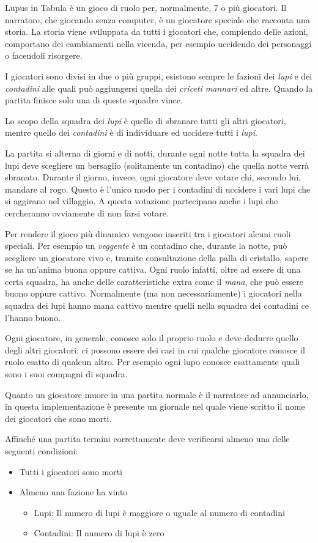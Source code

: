Lupus in Tabula è un gioco di ruolo per, normalmente, 7 o più giocatori. Il narratore, che giocando senza computer, è un giocatore speciale che racconta una storia. La storia viene sviluppata da tutti i giocatori che, compiendo delle azioni, comportano dei cambiamenti nella vicenda, per esempio uccidendo dei personaggi o facendoli risorgere.

I giocatori sono divisi in due o più gruppi, esistono sempre le fazioni dei \emph{lupi} e dei \emph{contadini} alle quali può aggiungersi quella dei \emph{criceti mannari} ed altre. Quando la partita finisce solo una di queste squadre vince.

Lo scopo della squadra dei \emph{lupi} è quello di sbranare tutti gli altri giocatori, mentre quello dei \emph{contadini} è di individuare ed uccidere tutti i \emph{lupi}.

La partita si alterna di giorni e di notti, durante ogni notte tutta la squadra dei lupi deve scegliere un bersaglio (solitamente un contadino) che quella notte verrà sbranato. Durante il giorno, invece, ogni giocatore deve votare chi, secondo lui, mandare al rogo. Questo è l'unico modo per i contadini di uccidere i vari lupi che si aggirano nel villaggio. A questa votazione partecipano anche i lupi che cercheranno ovviamente di non farsi votare.

Per rendere il gioco più dinamico vengono inseriti tra i giocatori alcuni ruoli speciali. Per esempio un \emph{veggente} è un contadino che, durante la notte, può scegliere un giocatore vivo e, tramite consultazione della palla di cristallo, sapere se ha un'anima buona oppure cattiva. Ogni ruolo infatti, oltre ad essere di una certa squadra, ha anche delle caratteristiche extra come il \emph{mana}, che può essere buono oppure cattivo. Normalmente (ma non necessariamente) i giocatori nella squadra dei lupi hanno mana cattivo mentre quelli nella squadra dei contadini ce l'hanno buono.

Ogni giocatore, in generale, conosce solo il proprio ruolo e deve dedurre quello degli altri giocatori; ci possono essere dei casi in cui qualche giocatore conosce il ruolo esatto di qualcun altro. Per esempio ogni lupo conosce esattamente quali sono i suoi compagni di squadra.

Quanto un giocatore muore in una partita normale è il narratore ad annunciarlo, in questa implementazione è presente un giornale nel quale viene scritto il nome dei giocatori che sono morti.

Affinché una partita termini correttamente deve verificarsi almeno una delle seguenti condizioni:

\begin{itemize}
	\item Tutti i giocatori sono morti
	\item Almeno una fazione ha vinto
	\begin{itemize}
		\item Lupi: Il numero di lupi è maggiore o uguale al numero di contadini
		\item Contadini: Il numero di lupi è zero
	\end{itemize}
\end{itemize}